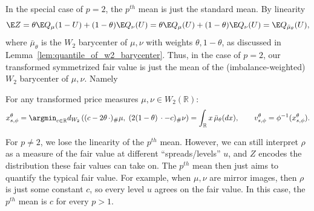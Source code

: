 In the special case of $p=2$, the $p^{th}$ mean is just the standard mean. By linearity
%
\[\E Z = \theta \E Q_\mu(1-U) + (1-\theta) \E Q_\nu(U) = \theta \E Q_\mu(U) + (1-\theta) \E Q_\nu(U) =\E Q_{\bar{\mu}_\theta}(U), \]
%
\noindent where $\bar{\mu}_\theta$ is the $W_2$ barycenter of $\mu, \nu$ with weights $\theta, 1-\theta$, as discussed in
Lemma~\ref{lem:quantile_of_w2_barycenter}. Thus, in the case of $p=2$, our transformed symmetrized fair value is just the mean of the
(imbalance-weighted) $W_2$ barycenter of $\mu, \nu$. Namely
%
\begin{corollary} For any transformed price measures $\mu,\nu\in W_2(\mathbb R)$:
%
    \[x_{s,\phi}^\theta = \argmin_{c \in \mathbb R} d_{W_2}\left((c-2\theta\,\cdot)_\#\mu, \; (2(1-\theta)\,\cdot-c)_\#\nu\right)
    = \int_\mathbb R x\,\bar{\mu}_\theta(dx),
    \qquad v_{s,\phi}^\theta=\phi^{-1}(x_{s,\phi}^\theta).\]
    \label{corr:w2_fv_is_mean_barycenter}
\end{corollary}
%
For $p \neq 2$, we lose the linearity of the $p^{th}$ mean. However, we can still
interpret $\rho$ as a measure of the fair value at different ``spreads/levels'' $u$, and $Z$
encodes the distribution these fair values can take on. The $p^{th}$ mean then just aims to quantify
the typical fair value. For example, when $\mu, \nu$ are mirror
images, then $\rho$ is just some constant $c$, so every level $u$ agrees on the fair value. In this case,
the $p^{th}$ mean is $c$ for every $p>1$.

